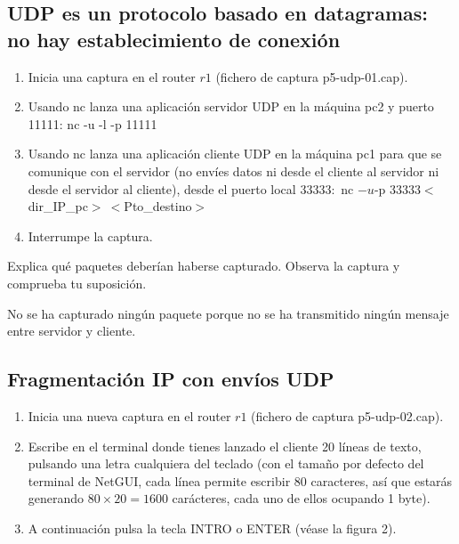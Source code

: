 \documentclass[12pt, a4paper]{report}
\begin{document}
\subsection{UDP es un protocolo basado en datagramas: no hay establecimiento de conexión}
\begin{enumerate}
	\item Inicia una captura en el router $r 1$ (fichero de captura p5-udp-01.cap).
	
	\item Usando nc lanza una aplicación servidor UDP en la máquina pc2 y puerto 11111: nc -u -l -p 11111
	
	\item Usando nc lanza una aplicación cliente UDP en la máquina pc1 para que se comunique con el servidor (no envíes datos ni desde el cliente al servidor ni desde el servidor al cliente), desde el puerto local $33333:$ nc $-u$-p $33333<$ dir\_IP\_pc$>\ <$Pto\_destino$>$ 
	
	\item Interrumpe la captura.
	
\end{enumerate}

Explica qué paquetes deberían haberse capturado. Observa la captura y comprueba tu suposición.
\newline

No se ha capturado ningún paquete porque no se ha transmitido ningún mensaje entre servidor y cliente.

\subsection{Fragmentación IP con envíos UDP}
\begin{enumerate}
	\item Inicia una nueva captura en el router $r 1$ (fichero de captura p5-udp-02.cap).
	
	\item Escribe en el terminal donde tienes lanzado el cliente 20 líneas de texto, pulsando una letra cualquiera del teclado (con el tamaño por defecto del terminal de NetGUI, cada línea permite escribir 80 caracteres, así que estarás generando $80 \times 20=1600$ carácteres, cada uno de ellos ocupando 1 byte).
	
	\item A continuación pulsa la tecla INTRO o ENTER (véase la figura 2).
	
\end{enumerate}
\end{document}
